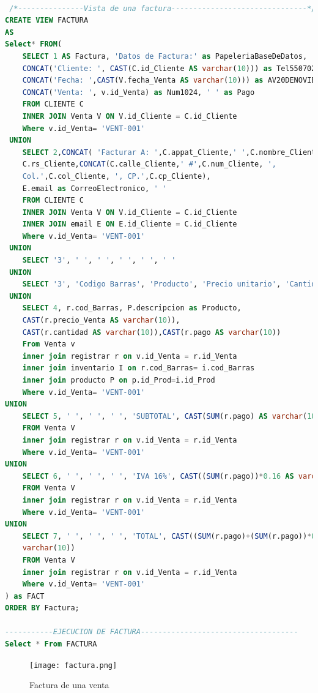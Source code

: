\documentclass[30pt,fleqn]{article}
\begin{document}
\begin{lstlisting}[language=sql, caption={Factura}]

 /*---------------Vista de una factura-------------------------------*/
CREATE VIEW FACTURA
AS
Select* FROM(
 	SELECT 1 AS Factura, 'Datos de Factura:' as PapeleriaBaseDeDatos, 
	CONCAT('Cliente: ', CAST(C.id_Cliente AS varchar(10))) as Tel55070220,  
	CONCAT('Fecha: ',CAST(V.fecha_Venta AS varchar(10))) as AV20DENOVIEMBRE, 
	CONCAT('Venta: ', v.id_Venta) as Num1024, ' ' as Pago
 	FROM CLIENTE C
	INNER JOIN Venta V ON V.id_Cliente = C.id_Cliente
 	Where v.id_Venta= 'VENT-001'
 UNION
	SELECT 2,CONCAT( 'Facturar A: ',C.appat_Cliente,' ',C.nombre_Cliente), 
	C.rs_Cliente,CONCAT(C.calle_Cliente,' #',C.num_Cliente, ',
	Col.',C.col_Cliente, ', CP.',C.cp_Cliente),
	E.email as CorreoElectronico, ' '
	FROM CLIENTE C
	INNER JOIN Venta V ON V.id_Cliente = C.id_Cliente
 	INNER JOIN email E ON E.id_Cliente = C.id_Cliente
  	Where v.id_Venta= 'VENT-001'
 UNION 
 	SELECT '3', ' ', ' ', ' ', ' ', ' '
 UNION 
 	SELECT '3', 'Codigo Barras', 'Producto', 'Precio unitario', 'Cantidad ', ' '
 UNION
	SELECT 4, r.cod_Barras, P.descripcion as Producto,
	CAST(r.precio_Venta AS varchar(10)), 
	CAST(r.cantidad AS varchar(10)),CAST(r.pago AS varchar(10)) 
	From Venta v
	inner join registrar r on v.id_Venta = r.id_Venta
	inner join inventario I on r.cod_Barras= i.cod_Barras
	inner join producto P on p.id_Prod=i.id_Prod
	Where v.id_Venta= 'VENT-001'
UNION
	SELECT 5, ' ', ' ', ' ', 'SUBTOTAL', CAST(SUM(r.pago) AS varchar(10))
	FROM Venta V
	inner join registrar r on v.id_Venta = r.id_Venta
	Where v.id_Venta= 'VENT-001'
UNION
	SELECT 6, ' ', ' ', ' ', 'IVA 16%', CAST((SUM(r.pago))*0.16 AS varchar(10))
	FROM Venta V
	inner join registrar r on v.id_Venta = r.id_Venta
	Where v.id_Venta= 'VENT-001'
UNION
	SELECT 7, ' ', ' ', ' ', 'TOTAL', CAST((SUM(r.pago)+(SUM(r.pago))*0.16) AS 
	varchar(10))
	FROM Venta V
	inner join registrar r on v.id_Venta = r.id_Venta
	Where v.id_Venta= 'VENT-001'
) as FACT
ORDER BY Factura;

-----------EJECUCION DE FACTURA------------------------------------
Select * From FACTURA

\end{lstlisting}

\vspace{5mm} %

\begin{figure}[h]
    \centering
    \texttt{[image: factura.png]}
    \caption{Factura de una venta}
    \label{fig:Factura de una venta}
\end{figure}
\end{document}
